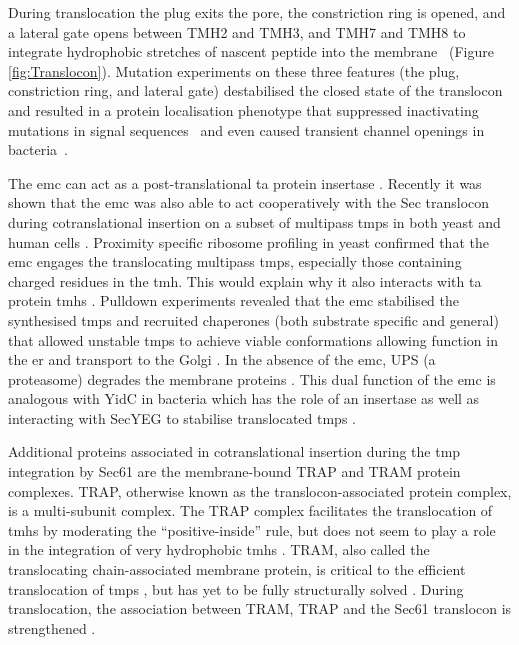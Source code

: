 During translocation the plug exits the pore, the constriction ring is opened, and a lateral gate opens between TMH2 and TMH3, and TMH7 and TMH8 to integrate hydrophobic stretches of nascent peptide into the membrane~\cite{Berg2004, Petriman2018, Hizlan2012, Bischoff2014, Gogala2014, Egea2010, Niesen2018, VandenBerg2004} (Figure \ref{fig:Translocon}).
Mutation experiments on these three features (the plug, constriction ring, and lateral gate) destabilised the closed state of the translocon and resulted in a protein localisation phenotype that suppressed inactivating mutations in signal sequences~\cite{Emr1981, Veenendaal2004, Li2007, Junne2007} and even caused transient channel openings in bacteria~\cite{Saparov2007}.

The \gls{emc} can act as a post\--translational \gls{ta} protein insertase \cite{Guna2018}.
Recently it was shown that the \gls{emc} was also able to act cooperatively with the Sec translocon during cotranslational insertion on a subset of multipass \gls{tmp}s in both yeast and human cells \cite{Shurtleff2018}.
Proximity specific ribosome profiling in yeast confirmed that the \gls{emc} engages the translocating multipass \gls{tmp}s, especially those containing charged residues in the \gls{tmh}.
This would explain why it also interacts with \gls{ta} protein \gls{tmh}s \cite{Guna2018, Shurtleff2018}.
Pulldown experiments revealed that the \gls{emc} stabilised the synthesised \gls{tmp}s and recruited chaperones (both substrate specific and general) that allowed unstable \gls{tmp}s to achieve viable conformations allowing function in the \gls{er} and transport to the Golgi \cite{Shurtleff2018}.
In the absence of the \gls{emc}, UPS (a proteasome) degrades the membrane proteins \cite{Shurtleff2018}.
This dual function of the \gls{emc} is analogous with YidC \cite{Shurtleff2018} in bacteria which has the role of an insertase \cite{Samuelson2000, Drew2003, Dalbey2014} as well as interacting with SecYEG to stabilise translocated \gls{tmp}s \cite{Nagamori2004}.

Additional proteins associated in cotranslational insertion during the \gls{tmp} integration by Sec61 are the membrane\--bound TRAP and TRAM protein complexes.
TRAP, otherwise known as the translocon\--associated protein complex, is a multi\--subunit complex.
The TRAP complex facilitates the translocation of \gls{tmh}s by moderating the ``positive\--inside'' rule, but does not seem to play a role in the integration of very hydrophobic \gls{tmh}s \cite{Sommer2013}.
TRAM, also called the translocating chain-associated membrane protein, is critical to the efficient translocation of \gls{tmp}s \cite{Voigt1996}, but has yet to be fully structurally solved \cite{Conti2015}.
During translocation, the association between TRAM, TRAP and the Sec61 translocon is strengthened \cite{Conti2015}.

